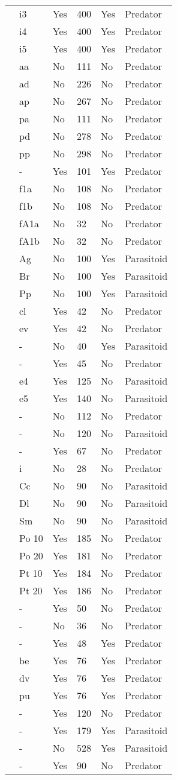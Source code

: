 \begin{longtable}{llllll}
\citet{Elliott:2005aa}&i3&Yes&400&Yes&Predator\tabularnewline
\citet{Elliott:2005aa}&i4&Yes&400&Yes&Predator\tabularnewline
\citet{Elliott:2005aa}&i5&Yes&400&Yes&Predator\tabularnewline
\citet{Eveleigh:1982aa}&aa&No&111&No&Predator\tabularnewline
\citet{Eveleigh:1982aa}&ad&No&226&No&Predator\tabularnewline
\citet{Eveleigh:1982aa}&ap&No&267&No&Predator\tabularnewline
\citet{Eveleigh:1982aa}&pa&No&111&No&Predator\tabularnewline
\citet{Eveleigh:1982aa}&pd&No&278&No&Predator\tabularnewline
\citet{Eveleigh:1982aa}&pp&No&298&No&Predator\tabularnewline
\citet{Fussmann:2005aa}&-&Yes&101&Yes&Predator\tabularnewline
\citet{Griffen:2007aa}&f1a&No&108&No&Predator\tabularnewline
\citet{Griffen:2007aa}&f1b&No&108&No&Predator\tabularnewline
\citet{Griffen:2007aa}&fA1a&No&32&No&Predator\tabularnewline
\citet{Griffen:2007aa}&fA1b&No&32&No&Predator\tabularnewline
\citet{Hassan:1976aa}&Ag&No&100&Yes&Parasitoid\tabularnewline
\citet{Hassan:1976aa}&Br&No&100&Yes&Parasitoid\tabularnewline
\citet{Hassan:1976aa}&Pp&No&100&Yes&Parasitoid\tabularnewline
\citet{Hossie:2016aa}&cl&Yes&42&No&Predator\tabularnewline
\citet{Hossie:2016aa}&ev&Yes&42&No&Predator\tabularnewline
\citet{Huffaker:1982aa}&-&No&40&Yes&Parasitoid\tabularnewline
\citet{Johnson:2006aa}&-&Yes&45&No&Predator\tabularnewline
\citet{Jones:1988aa}&e4&Yes&125&No&Parasitoid\tabularnewline
\citet{Jones:1988aa}&e5&Yes&140&No&Parasitoid\tabularnewline
\citet{Katz:1985ai}&-&No&112&No&Predator\tabularnewline
\citet{Kfir:1983aa}&-&No&120&No&Parasitoid\tabularnewline
\citet{Kratina:2009aa}&-&Yes&67&No&Predator\tabularnewline
\citet{Krylov:1992aa}&i&No&28&No&Predator\tabularnewline
\citet{Kumar:1985aa}&Cc&No&90&No&Parasitoid\tabularnewline
\citet{Kumar:1985aa}&Dl&No&90&No&Parasitoid\tabularnewline
\citet{Kumar:1985aa}&Sm&No&90&No&Parasitoid\tabularnewline
\citet{Lang:2012aa}&Po 10&Yes&185&No&Predator\tabularnewline
\citet{Lang:2012aa}&Po 20&Yes&181&No&Predator\tabularnewline
\citet{Lang:2012aa}&Pt 10&Yes&184&No&Predator\tabularnewline
\citet{Lang:2012aa}&Pt 20&Yes&186&No&Predator\tabularnewline
\citet{Long:2012aa}&-&Yes&50&No&Predator\tabularnewline
\citet{Mansour:1991aa}&-&No&36&No&Predator\tabularnewline
\citet{Medoc:2013aa}&-&Yes&48&Yes&Predator\tabularnewline
\citet{Medoc:2015aa}&be&Yes&76&Yes&Predator\tabularnewline
\citet{Medoc:2015aa}&dv&Yes&76&Yes&Predator\tabularnewline
\citet{Medoc:2015aa}&pu&Yes&76&Yes&Predator\tabularnewline
\citet{Mertz:1968aa}&-&Yes&120&No&Predator\tabularnewline
\citet{Mills:2004aa}&-&Yes&179&Yes&Parasitoid\tabularnewline
\citet{Montoya:2000aa}&-&No&528&Yes&Parasitoid\tabularnewline
\citet{Omkar:2004aa}&-&Yes&90&No&Predator\tabularnewline

\end{longtable}
